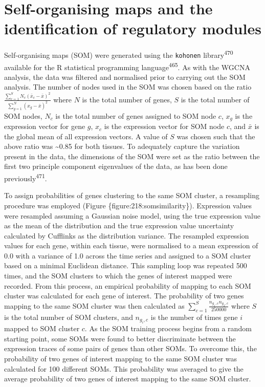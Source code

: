 \documentclass[12pt,]{book}
\begin{document}
\section{Self-organising maps and the identification of regulatory
modules}\label{section:methods:somclustering}

Self-organising maps (SOM) were generated using the \texttt{kohonen}
library\textsuperscript{470} available for the R statistical programming
language\textsuperscript{465}. As with the WGCNA analysis, the data was
filtered and normalised prior to carrying out the SOM analysis. The
number of nodes used in the SOM was chosen based on the ratio
\(\frac{\sum_{c=1}^{S}N_{c}(\bar{x}_{c}-\bar{x})^2}{\sum_{g=1}^{N}(x_{g}-\bar{x})^2}\)
where \(N\) is the total number of genes, \(S\) is the total number of
SOM nodes, \(N_{c}\) is the total number of genes assigned to SOM node
\(c\), \(x_{g}\) is the expression vector for gene \(g\), \(x_{c}\) is
the expression vector for SOM node \(c\), and \(\bar{x}\) is the global
mean of all expression vectors. A value of \(S\) was chosen such that
the above ratio was \textasciitilde{}0.85 for both tissues. To
adequately capture the variation present in the data, the dimensions of
the SOM were set as the ratio between the first two principle component
eigenvalues of the data, as has been done
previously\textsuperscript{471}.

To assign probabilities of genes clustering to the same SOM cluster, a
resampling procedure was employed (Figure \{figure:218:somsimilarity\}).
Expression values were resampled assuming a Gaussian noise model, using
the true expression value as the mean of the distribution and the true
expression value uncertainty calculated by Cufflinks as the distribution
variance. The resampled expression values for each gene, within each
tissue, were normalised to a mean expression of 0.0 with a variance of
1.0 across the time series and assigned to a SOM cluster based on a
minimal Euclidean distance. This sampling loop was repeated 500 times,
and the SOM clusters to which the genes of interest mapped were
recorded. From this process, an empirical probability of mapping to each
SOM cluster was calculated for each gene of interest. The probability of
two genes mapping to the same SOM cluster was then calculated as
\(\sum_{c=1}^{S}\frac{n_{g_{1}, c}n_{g_{2}, c}}{250000}\) where \(S\) is
the total number of SOM clusters, and \(n_{g_{i}, c}\) is the number of
times gene \(i\) mapped to SOM cluster \(c\). As the SOM training
process begins from a random starting point, some SOMs were found to
better discriminate between the expression traces of some pairs of genes
than other SOMs. To overcome this, the probability of two genes of
interest mapping to the same SOM cluster was calculated for 100
different SOMs. This probability was averaged to give the average
probability of two genes of interest mapping to the same SOM cluster.
\end{document}
